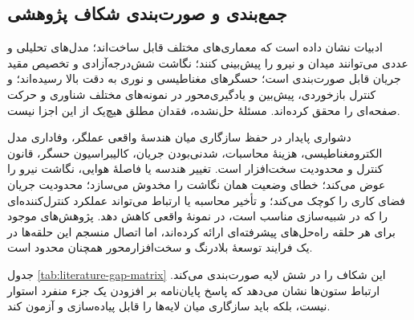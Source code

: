 \subsection{جمع‌بندی و صورت‌بندی شکاف پژوهشی}

ادبیات نشان داده است که معماری‌های مختلف  قابل ساخت‌اند؛ مدل‌های تحلیلی و عددی می‌توانند میدان و نیرو را پیش‌بینی کنند؛ نگاشت شش‌درجه‌آزادی و تخصیص مقید جریان قابل صورت‌بندی است؛ حسگرهای مغناطیسی و نوری به دقت بالا رسیده‌اند؛ و کنترل بازخوردی، پیش‌بین و یادگیری‌محور در نمونه‌های مختلف شناوری و حرکت صفحه‌ای را محقق کرده‌اند. مسئلهٔ حل‌نشده، فقدان مطلق هیچ‌یک از این اجزا نیست.

دشواری پایدار در حفظ سازگاری میان هندسهٔ واقعی عملگر، وفاداری مدل الکترومغناطیسی، هزینهٔ محاسبات، شدنی‌بودن جریان، کالیبراسیون حسگر، قانون کنترل و محدودیت سخت‌افزار است. تغییر هندسه یا فاصلهٔ هوایی، نگاشت نیرو را عوض می‌کند؛ خطای وضعیت همان نگاشت را مخدوش می‌سازد؛ محدودیت جریان فضای کاری را کوچک می‌کند؛ و تأخیر محاسبه یا ارتباط می‌تواند عملکرد کنترل‌کننده‌ای را که در شبیه‌سازی مناسب است، در نمونهٔ واقعی کاهش دهد. پژوهش‌های موجود برای هر حلقه راه‌حل‌های پیشرفته‌ای ارائه کرده‌اند، اما اتصال منسجم این حلقه‌ها در یک فرایند توسعهٔ بلادرنگ و سخت‌افزارمحور همچنان محدود است.

جدول \ref{tab:literature-gap-matrix} این شکاف را در شش لایه صورت‌بندی می‌کند. ارتباط ستون‌ها نشان می‌دهد که پاسخ پایان‌نامه بر افزودن یک جزء منفرد استوار نیست، بلکه باید سازگاری میان لایه‌ها را قابل پیاده‌سازی و آزمون کند.

